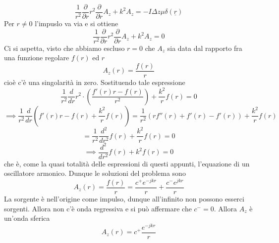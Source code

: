 \documentclass{book}
\begin{document}
            \begin{equation}
                \frac{1}{r^{2}} \frac{\partial}{\partial r} r^{2} \frac{\partial}{\partial r}A_{z} +k^{2}A_{z}= -I\Delta z \mu \delta(\underline{r})
            \end{equation}
            Per $r \neq 0$ l'impuslo va via e si ottiene
            \begin{equation}
                \frac{1}{r^{2}}\frac{\partial}{\partial r} r^{2}\frac{\partial}{\partial r} A_{z}+k^{2}A_{z} = 0
            \end{equation}
            Ci si aspetta, visto che abbiamo escluso $r = 0$ che $A_{z}$ sia data dal rapporto fra una funzione regolare $f(r)$ ed $r$
            \begin{equation}
                A_{z}(r) = \frac{f(r)}{r}
            \end{equation}
            cioè c'è una singolarità in zero. Sostituendo tale espressione
            \begin{equation}
                \frac{1}{r^{2}}\frac{d}{dr} r^{2} \cdot (\frac{f'(r)r - f(r)}{r^{2}})+\frac{k^{2}}{r}f(r) = 0
            \end{equation}
            \begin{equation}
                \implies \frac{1}{r^{2}}\frac{d}{dr}(f'(r)r-f(r)+\frac{k^{2}}{r}f(r))=\frac{1}{r^{2}}(r f''(r)+f'(r)-f'(r))+\frac{k^{2}}{r}f(r)
            \end{equation}
            \begin{equation}
                = \frac{1}{r^{2}}\frac{d^{2}}{dr^{2}}f(r)+\frac{k^{2}}{r}f(r) = 0
            \end{equation}
            \begin{equation}
                \implies \frac{d^{2}}{dr^{2}}f(r) +k^{2}f(r) = 0
            \end{equation}
            che è, come la quasi totalità delle espressioni di questi appunti, l'equazione di un oscillatore armonico. Dunque le soluzioni del problema sono  
            \begin{equation}
                 A_{z}(r) = \frac{f(r)}{r} = \frac{c^{+}e^{-jkr}}{r}+\frac{c^{-}e^{jkr}}{r}
            \end{equation}
            La sorgente è nell'origine come impulso, dunque all'infinito non possono esserci sorgenti. Allora non c'è onda regressiva e si può affermare che $c^{-}=0$. Allora $A_{z}$ è un'onda sferica 
            \begin{equation}
                A_{z}(r) = c^{+}\frac{e^{-jkr}}{r}
            \end{equation}
\end{document}
